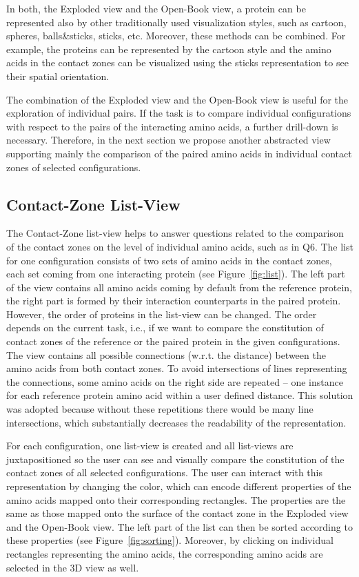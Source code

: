 \documentclass{bmcart}
\def\OpBook {Open-Book view\xspace}
\def\ExpView {Exploded view\xspace}
\def\CoZoListView {Contact-Zone list-view\xspace}
\begin{document}
In both, the \ExpView and the \OpBook, a protein can be represented also by other traditionally used visualization styles, such as cartoon, spheres, balls\&sticks, sticks, etc.
Moreover, these methods can be combined. 
For example, the proteins can be represented by the cartoon style and the amino acids in the contact zones can be visualized using the sticks representation to see their spatial orientation.%

The combination of the \ExpView and the \OpBook is useful for the exploration of individual pairs.
If the task is to compare individual configurations with respect to the pairs of the interacting amino acids, a further drill-down is necessary.
Therefore, in the next section we propose another abstracted view supporting mainly the comparison of the paired amino acids in individual contact zones of selected configurations.


\subsection*{Contact-Zone List-View}
The \CoZoListView helps to answer questions related to the comparison of the contact zones on the level of individual amino acids, such as in Q6.
The list for one configuration consists of two sets of amino acids in the contact zones, each set coming from one interacting protein (see Figure~\ref{fig:list}).
The left part of the view contains all amino acids coming by default from the reference protein, the right part is formed by their interaction counterparts in the paired protein.
However, the order of proteins in the list-view can be changed.
The order depends on the current task, i.e., if we want to compare the constitution of contact zones of the reference or the paired protein in the given configurations.
The view contains all possible connections (w.r.t. the distance) between the amino acids from both contact zones.
To avoid intersections of lines representing the connections, some amino acids on the right side are repeated -- one instance for each reference protein amino acid within a user defined distance. 
This solution was adopted because without these repetitions there would be many line intersections, which substantially decreases the readability of the representation.

For each configuration, one list-view is created and all list-views are juxtapositioned so the user can see and visually compare the constitution of the contact zones of all selected configurations.
The user can interact with this representation by changing the color, which can encode different properties of the amino acids mapped onto their corresponding rectangles.
The properties are the same as those mapped onto the surface of the contact zone in the Exploded view and the Open-Book view.
The left part of the list can then be sorted according to these properties (see Figure~\ref{fig:sorting}).
Moreover, by clicking on individual rectangles representing the amino acids, the corresponding amino acids are selected in the 3D view as well.
\end{document}
